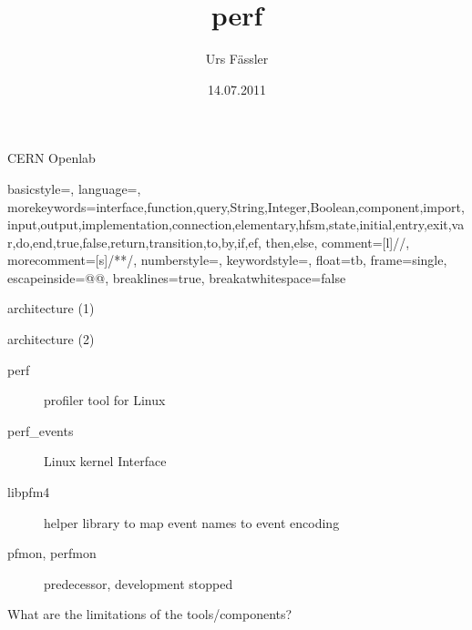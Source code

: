 
\usepackage[utf8x]{inputenc}
\usepackage{ucs}
\usepackage{amsmath}
\usepackage{amsfonts}
\usepackage{amssymb}
\usepackage{multicol}
\usepackage{graphicx}
\usepackage{tikz}
\usetikzlibrary{arrows,positioning,shapes}
\usepackage{listings}
\usepackage{multicol}
\usepackage{appendixnumberbeamer}
\usepackage{pstricks}
\usepackage{marvosym}

\title{perf}
\author{Urs F\"assler}
\date{14.07.2011}
\institute
{
  CERN Openlab
}

\lstset
{  
  basicstyle=\small\ttfamily,
  language=,
  morekeywords={interface,function,query,String,Integer,Boolean,component,import,input,output,implementation,connection,elementary,hfsm,state,initial,entry,exit,var,do,end,true,false,return,transition,to,by,if,ef, then,else},
  comment=[l]{//},
  morecomment=[s]{/*}{*/},
  numberstyle={\color{Grey}},
  keywordstyle={\bfseries\color{DarkRed}},
  float=tb,
  frame=single,
  escapeinside={@}{@},
  breaklines=true, %
  breakatwhitespace=false %
}



\beamertemplatenavigationsymbolsempty


\begin{frame}[plain]
  \titlepage
\end{frame}

\setcounter{framenumber}{0}

\begin{frame}{architecture (1)}
\centering{
  }
\end{frame}

\begin{frame}{architecture (2)}
\begin{description}
  \item[perf] profiler tool for Linux
  \item[perf\_events] Linux kernel Interface
  \item[libpfm4] helper library to map event names to event encoding
  \item[pfmon, perfmon] predecessor, development stopped
\end{description}
\end{frame}

What are the limitations of the tools/components? 

